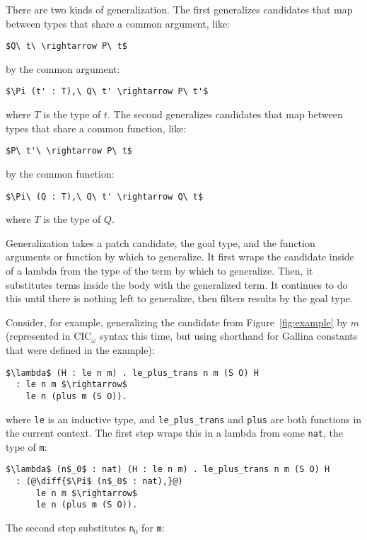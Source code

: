 There are two kinds of generalization.
The first generalizes candidates that map between types that share a common argument, like: %

\begin{lstlisting}[language=coq]
  $Q\ t\ \rightarrow P\ t$
\end{lstlisting}
by the common argument:

\begin{lstlisting}[language=coq]
  $\Pi (t' : T),\ Q\ t' \rightarrow P\ t'$
\end{lstlisting}
where $T$ is the type of $t$.
The second generalizes candidates that map between types that share a common function, like:

\begin{lstlisting}[language=coq]
  $P\ t'\ \rightarrow P\ t$
\end{lstlisting}
by the common function:

\begin{lstlisting}[language=coq]
  $\Pi\ (Q : T),\ Q\ t' \rightarrow Q\ t$
\end{lstlisting}
where $T$ is the type of $Q$.

Generalization takes a patch candidate, the goal type, and the function arguments or function by which to generalize.
It first wraps the candidate inside of a lambda from the type of the term by which to generalize.
Then, it substitutes terms inside the body with the generalized term.
It continues to do this until there is nothing left to generalize, then filters results by the goal type.

Consider, for example, generalizing the candidate from Figure~\ref{fig:example} by $m$ (represented in CIC$_{\omega}$ syntax this time,
but using shorthand for Gallina constants that were defined in the example): %

\begin{lstlisting}[language=coq]
  $\lambda$ (H : le n m) . le_plus_trans n m (S O) H
  : le n m $\rightarrow$
    le n (plus m (S O)).
\end{lstlisting}
where \lstinline{le} is an inductive type, and \lstinline{le_plus_trans} and \lstinline{plus} are both functions in the current context.
The first step wraps this in a lambda from some \lstinline{nat}, the type of \lstinline{m}:

\begin{lstlisting}[language=coq]
  $\lambda$ (n$_0$ : nat) (H : le n m) . le_plus_trans n m (S O) H
  : (@\diff{$\Pi$ (n$_0$ : nat),}@)
      le n m $\rightarrow$
      le n (plus m (S O)).
\end{lstlisting}
The second step substitutes \lstinline{n}$_0$ for \lstinline{m}:

